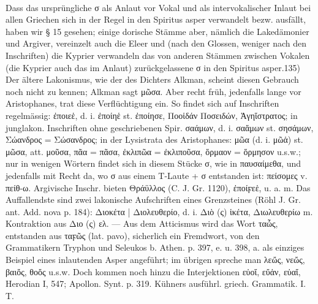 \paragraph{} Dass das ursprüngliche σ als Anlaut vor Vokal und als
intervokalischer Inlaut bei allen Griechen sich in der Regel in den Spiritus
asper verwandelt bezw. ausfällt, haben wir § 15 gesehen; einige dorische Stämme
aber, nämlich die Lakedämonier und Argiver, vereinzelt auch die Eleer und (nach
den Glossen, weniger nach den Inschriften) die Kyprier verwandeln das von
anderen Stämmen zwischen Vokalen (die Kyprier auch das im Anlaut)
zurückgelassene σ in den Spiritus asper.135) Der ältere Lakonismus, wie der des
Dichters Alkman, scheint diesen Gebrauch noch nicht zu kennen; Alkman sagt μῶσα.
Aber recht früh, jedenfalls lange vor Aristophanes, trat diese Verflüchtigung
ein. So findet sich auf Inschriften regelmässig: ἐποιεἑ, d. i. ἐποίηἑ st.
ἐποίησε, Ποοἱδάν Ποσειδών, Ἁγηἵστρατος; in junglakon. Inschriften ohne
geschriebenen Spir. σαάμων, d. i. σαἅμων st. σησάμων, Σώανδρος = Σώσανδρος; in
der Lysistrata des Aristophanes: μῶα (d. i. μῶἁ) st. μῶσα, att. μοῦσα, πᾶα =
πᾶσα, ἐκλιπῶα = ἐκλιποῦσα, ὅρμαον = ὅρμησον u.s.w.; nur in wenigen Wörtern
findet sich in diesem Stücke σ, wie in παυσαίμεθα, und jedenfalls mit Recht da,
wo σ aus einem T-Laute + σ entstanden ist: πείσομες v. πείθ-ω. Argivische
Inschr. bieten Θράϋλλος (C. J. Gr. 1120), ἐποίϝεἑ, u. a. m. Das Auffallendste
sind zwei lakonische Aufschriften eines Grenzsteines (Röhl J. Gr. ant. Add. nova
p. 184): Διοκέτα | Διολευθερίο, d. i. Διὸ (ς) ἱκέτα, Διωλευθερίω m. Kontraktion
aus Διο (ς) ελ. — Aus dem Atticismus wird das Wort ταὧς, entstanden aus ταϝῶς
(lat. pavo), sicherlich ein Fremdwort, von den Grammatikern Tryphon und Seleukos
b. Athen. p. 397, e. u. 398, a. als einziges Beispiel eines inlautenden Asper
angeführt; im übrigen spreche man λεὤς, νεὤς, βαιὄς, θοὄς u.s.w. Doch kommen
noch hinzu die Interjektionen εὐοἵ, εὔἁν, εὐαἵ, Herodian Ι, 547; Apollon. Synt.
p. 319. Kühners ausführl. griech. Grammatik. I. T. 

